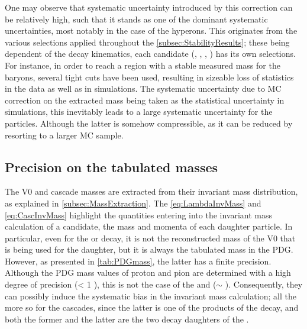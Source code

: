 One may observe that systematic uncertainty introduced by this correction can be relatively high, such that it stands as one of the dominant systematic uncertainties, most notably in the case of the \rmXi hyperons. This originates from the various selections applied throughout the \Sec\ref{subsec:StabilityResults}; these being dependent of the decay kinematics, each candidate (\rmKzeroS, \rmLambda, \rmXi, \rmOmega) has its own selections. For instance, in order to reach a region with a stable measured mass for the \rmXi baryons, several tight cuts have been used, resulting in sizeable loss of statistics in the data as well as in simulations. The systematic uncertainty due to MC correction on the extracted mass being taken as the statistical uncertainty in simulations, this inevitably leads to a large systematic uncertainty for the \rmXi particles. Although the latter is somehow compressible, as it can be reduced by resorting to a larger MC sample. 

\subsection{Precision on the tabulated masses}

The V0 and cascade masses are extracted from their invariant mass distribution, as explained in \Sec\ref{subsec:MassExtraction}. The \eq\ref{eq:LambdaInvMass} and \ref{eq:CascInvMass} highlight the quantities entering into the invariant mass calculation of a candidate, \ie the mass and momenta of each daughter particle. In particular, even for the \rmXiPM or \rmOmegaPM decay, it is not the reconstructed mass of the V0 that is being used for the \rmLambdaPM daughter, but it is always the tabulated mass in the PDG. However, as presented in \tab\ref{tab:PDGmass}, the latter has a finite precision. Although the PDG mass values of proton and pion are determined with a high degree of precision (\sigmaPDG < 1 \kmass), this is not the case of the \rmKPM and \rmLambdaPM (\sigmaPDG $\sim$ \kmass). Consequently, they can possibly induce the systematic bias in the invariant mass calculation; all the more so for the cascades, since the latter is one of the products of the \rmXi decay, and both the former and the latter are the two decay daughters of the \rmOmega. 

